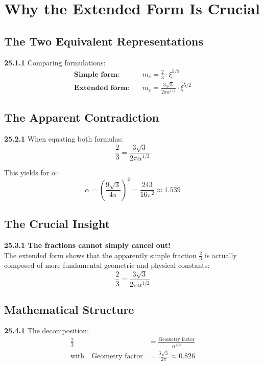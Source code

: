 \section{Why the Extended Form Is Crucial}

\subsection{The Two Equivalent Representations}

\noindent \textbf{25.1.1} Comparing formulations:
\begin{align*}
	\textbf{Simple form:} &\quad m_e = \frac{2}{3} \cdot \xi^{5/2} \\
	\textbf{Extended form:} &\quad m_e = \frac{3\sqrt{3}}{2\pi\alpha^{1/2}} \cdot \xi^{5/2}
\end{align*}

\subsection{The Apparent Contradiction}

\noindent \textbf{25.2.1} When equating both formulas:
\[
\frac{2}{3} = \frac{3\sqrt{3}}{2\pi\alpha^{1/2}}
\]

This yields for $\alpha$:
\[
\alpha = \left(\frac{9\sqrt{3}}{4\pi}\right)^2 = \frac{243}{16\pi^2} \approx 1.539
\]

\subsection{The Crucial Insight}

\begin{tcolorbox}[colback=red!5!white,colframe=red!75!black]
	\textbf{25.3.1 The fractions cannot simply cancel out!}
	\\
	The extended form shows that the apparently simple fraction $\frac{2}{3}$ is actually composed of more fundamental geometric and physical constants:
	\[
	\frac{2}{3} = \frac{3\sqrt{3}}{2\pi\alpha^{1/2}}
	\]
\end{tcolorbox}

\subsection{Mathematical Structure}

\noindent \textbf{25.4.1} The decomposition:
\begin{align*}
	\frac{2}{3} &= \frac{\text{Geometry factor}}{\alpha^{1/2}} \\
	\text{with} \quad \text{Geometry factor} &= \frac{3\sqrt{3}}{2\pi} \approx 0.826
\end{align*}

